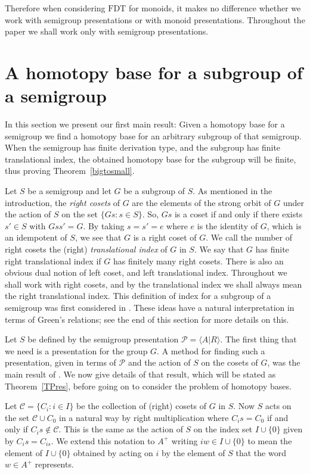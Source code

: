 \documentclass[11pt]{amsart}
\theoremstyle{plain}
\begin{document}
Therefore when considering $\mathrm{FDT}$ for monoids, it makes no difference whether we work with semigroup presentations or with monoid presentations. Throughout the paper we shall work only with semigroup presentations. 

\section{A homotopy base for a subgroup of a semigroup}

In this section we present our first main result: Given a homotopy base for a semigroup we find a homotopy base for an arbitrary subgroup of that semigroup. When the semigroup has finite derivation type, and the subgroup has finite translational index, the obtained homotopy base for the subgroup will be finite, thus proving Theorem~\ref{bigtosmall}.

Let $S$ be a semigroup and let $G$ be a subgroup of $S$. As mentioned in the introduction, the \emph{right cosets} of $G$ are the elements of the strong orbit of $G$ under the action of $S$ on the set $\{ Gs : s \in S \}$. So, $Gs$ is a coset if and only if there exists $s' \in S$ with $Gss'=G$. By taking $s = s' = e$ where $e$ is the identity of $G$, which is an idempotent of $S$, 
we see that $G$ is a right coset of $G$. We call the number of right cosets the (right) \emph{translational index} of $G$ in $S$. We say that $G$ has finite right translational index if $G$ has finitely many right cosets. There is also an obvious dual notion of left coset, and left translational index. Throughout we shall work with right cosets, and by the translational index we shall always mean the right translational index. This definition of index for a subgroup of a semigroup was first considered in \cite{Ruskuc2}. These ideas have a natural interpretation in terms of Green's relations; see the end of this section for more details on this.

Let $S$ be defined by the semigroup presentation $\mathcal{P} = {\langle} A | R {\rangle}$. The first thing that we need is a presentation for the group $G$. A method for finding such a presentation, given in terms of $\mathcal{P}$ and the action of $S$ on the cosets of $G$, was the main result of \cite{Ruskuc2}. We now give details of that result, which will be stated as Theorem~\ref{TPres}, before going on to consider the problem of homotopy bases.

Let $\mathcal{C} = \{ C_i : i \in I \}$ be the collection of (right) cosets of $G$ in $S$. Now $S$ acts on the set $\mathcal{C} \cup C_0$ in a natural way by right multiplication where $C_i s = C_0$ if and only if $C_i s \not\in \mathcal{C}$. This is the same as the action of $S$ on the index set $I \cup \{ 0 \}$ given by $C_i s = C_{is}$. We extend this notation to $A^+$ writing $i w \in I \cup \{0 \}$ to mean the element of $I \cup \{0 \}$ obtained by acting on $i$ by the element of $S$ that the word $w \in A^+$ represents.
\end{document}
